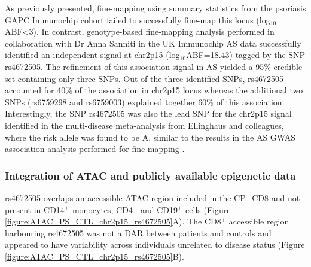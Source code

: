 As previously presented, fine-mapping using summary statistics from the psoriasis GAPC Immunochip cohort failed to successfully fine-map this locus (log$_{10}$ABF<3). In contrast, genotype-based fine-mapping analysis performed in collaboration with Dr Anna Sanniti in the UK Immunochip AS data successfully identified an independent signal at chr2p15 (log$_{10}$ABF=18.43) tagged by the SNP rs4672505. The refinement of this association signal in AS yielded a 95\% credible set containing only three SNPs. Out of the three identified SNPs, rs4672505 accounted for 40\% of the association in chr2p15 locus whereas the additional two SNPs (rs6759298 and rs6759003) explained together 60\% of this association. Interestingly, the SNP rs4672505 was also the lead SNP for the chr2p15 signal identified in the multi-disease meta-analysis from Ellinghaus and colleagues, where the risk allele was found to be A, similar to the results in the AS GWAS association analysis performed for fine-mapping \parencite{Ellinghaus2016}.

\subsubsection{Integration of ATAC and publicly available epigenetic data}
rs4672505 overlaps an accessible ATAC region included in the CP\_CD8 and not present in CD14$^+$ monocytes, CD4$^+$ and CD19$^+$ cells (Figure \ref{figure:ATAC_PS_CTL_chr2p15_rs4672505}A). The CD8$^+$ accessible region harbouring rs4672505 was not a DAR between patients and controls and appeared to have variability across individuals unrelated to disease status (Figure \ref{figure:ATAC_PS_CTL_chr2p15_rs4672505}B). 


